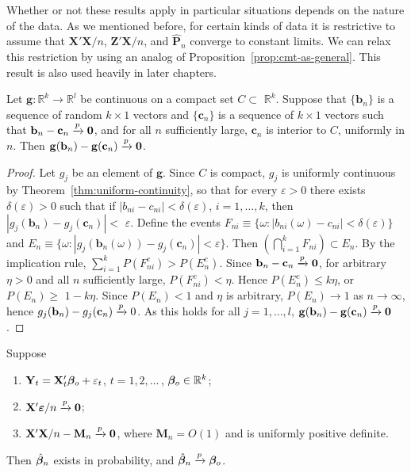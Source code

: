 Whether or not these results apply in particular situations depends on
the nature of the data. As we mentioned before, for certain kinds of data it
is restrictive to assume that $\mathbf{X}'\mathbf{X}/n$, $\mathbf{Z}'\mathbf{X}/n$, and $\hat{\mathbf{P}}_n$ converge to constant
limits. We can relax this restriction by using an analog of Proposition~\ref{prop:cmt-as-general}.
This result is also used heavily in later chapters.

\begin{proposition}\label{prop:cmt-p-general}
Let $\mathbf{g} : \mathbb{R}^k \to \mathbb{R}^l$ be continuous on a compact set $C \subset$
$\mathbb{R}^k$. Suppose that $\{\mathbf{b}_n\}$ is a sequence of random $k \times 1$ vectors and $\{\mathbf{c}_n\}$ is a
sequence of $k \times 1$ vectors such that $\mathbf{b}_n - \mathbf{c}_n \xrightarrow{p} \mathbf{0}$, and for all $n$ sufficiently
large, $\mathbf{c}_n$ is interior to $C$, uniformly in $n$. Then $\mathbf{g}(\mathbf{b}_n) - \mathbf{g}(\mathbf{c}_n) \xrightarrow{p} \mathbf{0}$.
\end{proposition}

\begin{proof}
Let $g_j$ be an element of $\mathbf{g}$. Since $C$ is compact, $g_j$ is uniformly
continuous by Theorem~\ref{thm:uniform-continuity}, so that for every $\varepsilon > 0$ there exists $\delta(\varepsilon) > 0$
such that if $|b_{ni} - c_{ni}| < \delta(\varepsilon)$, $i = 1, \ldots, k$, then $|g_j(\mathbf{b}_n) - g_j(\mathbf{c}_n)| <$
$\varepsilon$. Define the events $F_{ni} \equiv \{\omega : |b_{ni}(\omega) - c_{ni}| < \delta(\varepsilon)\}$ and $E_n \equiv \{\omega :
|g_j(\mathbf{b}_n(\omega)) - g_j(\mathbf{c}_n)| < \varepsilon\}$. Then $\left(\bigcap_{i=1}^k F_{ni}\right) \subset E_n$. By the implication
rule, $\sum_{i=1}^k P(F_{ni}^c) > P(E_n^c)$. Since $\mathbf{b}_n - \mathbf{c}_n \xrightarrow{p} \mathbf{0}$, for arbitrary $\eta > 0$
and all $n$ sufficiently large, $P(F_{ni}^c) < \eta$. Hence $P(E_n^c) \leq k\eta$, or $P(E_n) \geq$
$1 - k\eta$. Since $P(E_n) < 1$ and $\eta$ is arbitrary, $P(E_n) \to 1$ as $n \to \infty$, hence
$g_j(\mathbf{b}_n) - g_j(\mathbf{c}_n) \xrightarrow{p} 0$. As this holds for all $j = 1, \ldots, l$, $\mathbf{g}(\mathbf{b}_n) - \mathbf{g}(\mathbf{c}_n) \xrightarrow{p} \mathbf{0}$.
\end{proof}

\begin{theorem}\label{thm:ols-weak-general}
Suppose
\begin{enumerate}[label=$(\roman*)$]
\item $\mathbf{Y}_t = \mathbf{X}_t'\boldsymbol{\beta}_o + \varepsilon_t$, \quad $t = 1, 2, \ldots$\,, $\boldsymbol{\beta}_o \in \mathbb{R}^k$;
\item $\mathbf{X}'\boldsymbol{\varepsilon}/n \xrightarrow{p} \mathbf{0}$;
\item $\mathbf{X}'\mathbf{X}/n - \mathbf{M}_n \xrightarrow{p} \mathbf{0}$, where $\mathbf{M}_n = O(1)$ and is uniformly positive
definite.
\end{enumerate}
Then $\hat{\boldsymbol{\beta}}_n$ exists in probability, and $\hat{\boldsymbol{\beta}}_n \xrightarrow{p} \boldsymbol{\beta}_o$.
\end{theorem}

